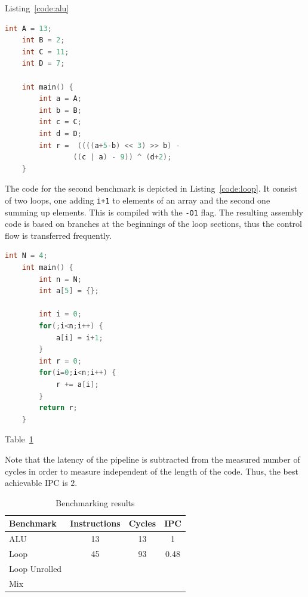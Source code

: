 \documentclass[conference]{IEEEtran}
\begin{document}
Listing~\ref{code:alu}

\begin{lstlisting}[language=C, caption=Code for the ALU benchmark, label=code:alu]
	int A = 13;
	int B = 2;
	int C = 11;
	int D = 7;

	int main() {
		int a = A;
		int b = B;
		int c = C;
		int d = D;
		int r =  ((((a+5-b) << 3) >> b) -
				((c | a) - 9)) ^ (d+2);
	}
\end{lstlisting}

The code for the second benchmark is depicted in Listing~\ref{code:loop}. It consist of two loops, one adding \verb|i+1| to elements of an array and the second one summing up elements. This is compiled with the \verb|-O1| flag. The resulting assembly code is based on branches at the beginnings of the loop sections, thus the control flow is transferred frequently.

\begin{lstlisting}[language=C, caption=Code for the loop benchmark, label=code:loop]
	int N = 4;
	int main() {
		int n = N;
		int a[5] = {};

		int i = 0;
		for(;i<n;i++) {
			a[i] = i+1;
		}
		int r = 0;
		for(i=0;i<n;i++) {
			r += a[i];
		}
		return r;
	}
\end{lstlisting}

Table~\ref{tab:results}

Note that the latency of the pipeline is subtracted from the measured number of cycles in order to measure independent of the length of the code. Thus, the best achievable IPC is $2$.

\begin{table} [h]
	\caption{Benchmarking results}
	\centering
	\begin{tabular}{l c c c}
			Benchmark & Instructions & Cycles & IPC \\
		\midrule
			ALU & 13 & 13 & 1 \\
			Loop & 45 & 93 & 0.48 \\
			Loop Unrolled & & & \\
			Mix & & & 
	\end{tabular}
	\label{tab:results}
\end{table}

\end{document}
